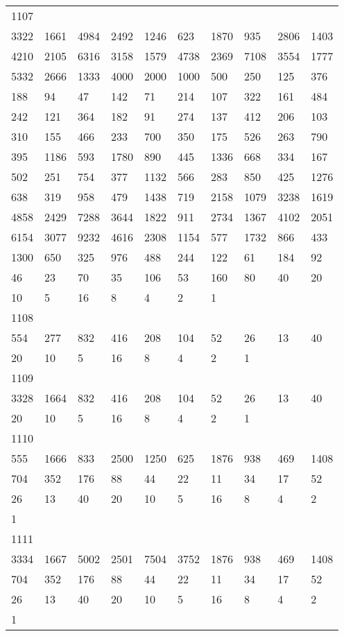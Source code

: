 \begin{longtable}{*{10}{l}}
1107&&&&&&&&&\\
3322& 1661& 4984& 2492& 1246& 623& 1870& 935& 2806& 1403\\
4210& 2105& 6316& 3158& 1579& 4738& 2369& 7108& 3554& 1777\\
5332& 2666& 1333& 4000& 2000& 1000& 500& 250& 125& 376\\
188& 94& 47& 142& 71& 214& 107& 322& 161& 484\\
242& 121& 364& 182& 91& 274& 137& 412& 206& 103\\
310& 155& 466& 233& 700& 350& 175& 526& 263& 790\\
395& 1186& 593& 1780& 890& 445& 1336& 668& 334& 167\\
502& 251& 754& 377& 1132& 566& 283& 850& 425& 1276\\
638& 319& 958& 479& 1438& 719& 2158& 1079& 3238& 1619\\
4858& 2429& 7288& 3644& 1822& 911& 2734& 1367& 4102& 2051\\
6154& 3077& 9232& 4616& 2308& 1154& 577& 1732& 866& 433\\
1300& 650& 325& 976& 488& 244& 122& 61& 184& 92\\
46& 23& 70& 35& 106& 53& 160& 80& 40& 20\\
10& 5& 16& 8& 4& 2& 1& \\

1108&&&&&&&&&\\
554& 277& 832& 416& 208& 104& 52& 26& 13& 40\\
20& 10& 5& 16& 8& 4& 2& 1& \\

1109&&&&&&&&&\\
3328& 1664& 832& 416& 208& 104& 52& 26& 13& 40\\
20& 10& 5& 16& 8& 4& 2& 1& \\

1110&&&&&&&&&\\
555& 1666& 833& 2500& 1250& 625& 1876& 938& 469& 1408\\
704& 352& 176& 88& 44& 22& 11& 34& 17& 52\\
26& 13& 40& 20& 10& 5& 16& 8& 4& 2\\
1& \\

1111&&&&&&&&&\\
3334& 1667& 5002& 2501& 7504& 3752& 1876& 938& 469& 1408\\
704& 352& 176& 88& 44& 22& 11& 34& 17& 52\\
26& 13& 40& 20& 10& 5& 16& 8& 4& 2\\
1& \\


\end{longtable}
